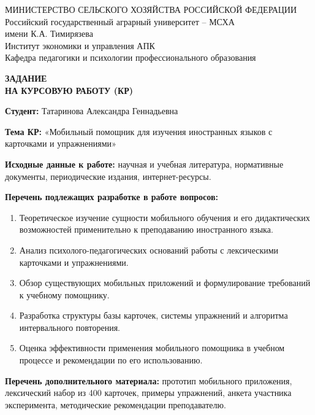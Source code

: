 \documentclass[11pt,a4paper,openany]{report}
\begin{document}
\thispagestyle{empty}
\begin{center}
{\footnotesize
МИНИСТЕРСТВО СЕЛЬСКОГО ХОЗЯЙСТВА РОССИЙСКОЙ ФЕДЕРАЦИИ\\[1pt]
Российский государственный аграрный университет -- МСХА\\
имени К.А. Тимирязева\\[5pt]
Институт экономики и управления АПК\\
Кафедра педагогики и психологии профессионального образования\par}

\vspace{18pt}
{\large\bfseries ЗАДАНИЕ\\[3pt] НА КУРСОВУЮ РАБОТУ (КР)\par}
\end{center}

\vspace{14pt}
\begingroup\normalsize

\textbf{Студент:} Татаринова Александра Геннадьевна

\textbf{Тема КР:} «Мобильный помощник для изучения иностранных языков с карточками и упражнениями»

\textbf{Исходные данные к работе:} научная и учебная литература, нормативные документы, периодические издания, интернет-ресурсы.

\textbf{Перечень подлежащих разработке в работе вопросов:}
\begin{enumerate}
\item Теоретическое изучение сущности мобильного обучения и его дидактических возможностей применительно к преподаванию иностранного языка.
\item Анализ психолого-педагогических оснований работы с лексическими карточками и упражнениями.
\item Обзор существующих мобильных приложений и формулирование требований к учебному помощнику.
\item Разработка структуры базы карточек, системы упражнений и алгоритма интервального повторения.
\item Оценка эффективности применения мобильного помощника в учебном процессе и рекомендации по его использованию.
\end{enumerate}

\textbf{Перечень дополнительного материала:} прототип мобильного приложения, лексический набор из 400 карточек, примеры упражнений, анкета участника эксперимента, методические рекомендации преподавателю.
\end{document}
